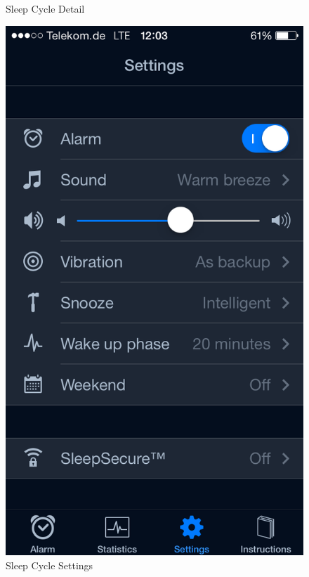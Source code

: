 \begin{figure}[]
\begin{minipage}[b]{0.47\textwidth}
    \caption{Sleep Cycle Detail}
    \label{fig:SCDetail}
  \end{minipage}
  \begin{minipage}[b]{0.47\textwidth}
    \centering
    \includegraphics[scale=0.3]{images/SleepCycle/Settings1}  
    \caption{Sleep Cycle Settings}
    \label{fig:SCSettings}
  \end{minipage}
\end{figure}

